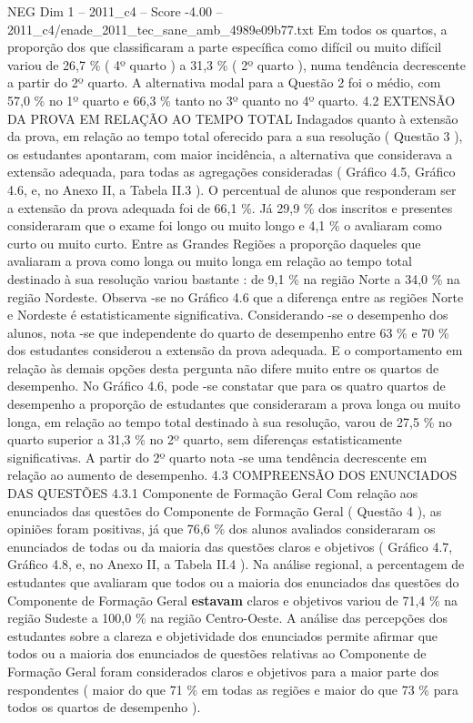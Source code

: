 \begin{textsample}{NEG Dim 1 – 2011\_c4 – Score -4.00 – 2011\_c4/enade\_2011\_tec\_sane\_amb\_4989e09b77.txt}
Em todos os quartos, a proporção dos que classificaram a parte específica como difícil ou muito difícil variou de 26,7 \% ( 4º quarto ) a 31,3 \% ( 2º quarto ), numa tendência decrescente a partir do 2º quarto.
A alternativa modal para a Questão 2 foi o médio, com 57,0 \% no 1º quarto e 66,3 \% tanto no 3º quanto no 4º quarto. 4.2 EXTENSÃO DA PROVA EM RELAÇÃO AO TEMPO TOTAL Indagados quanto à extensão da prova, em relação ao tempo total oferecido para a sua resolução ( Questão 3 ), os estudantes apontaram, com maior incidência, a alternativa que considerava a extensão adequada, para todas as agregações consideradas ( Gráfico 4.5, Gráfico 4.6, e, no Anexo II, a Tabela II.3 ).
O percentual de alunos que responderam ser a extensão da prova adequada foi de 66,1 \%.
Já 29,9 \% dos inscritos e presentes consideraram que o exame foi longo ou muito longo e 4,1 \% o avaliaram como curto ou muito curto.
Entre as Grandes Regiões a proporção daqueles que avaliaram a prova como longa ou muito longa em relação ao tempo total destinado à sua resolução variou bastante : de 9,1 \% na região Norte a 34,0 \% na região Nordeste.
Observa -se no Gráfico 4.6 que a diferença entre as regiões Norte e Nordeste é estatisticamente significativa.
Considerando -se o desempenho dos alunos, nota -se que independente do quarto de desempenho entre 63 \% e 70 \% dos estudantes considerou a extensão da prova adequada.
E o comportamento em relação às demais opções desta pergunta não difere muito entre os quartos de desempenho.
No Gráfico 4.6, pode -se constatar que para os quatro quartos de desempenho a proporção de estudantes que consideraram a prova longa ou muito longa, em relação ao tempo total destinado à sua resolução, varou de 27,5 \% no quarto superior a 31,3 \% no 2º quarto, sem diferenças estatisticamente significativas.
A partir do 2º quarto nota -se uma tendência decrescente em relação ao aumento de desempenho. 4.3 COMPREENSÃO DOS ENUNCIADOS DAS QUESTÕES 4.3.1 Componente de Formação Geral Com relação aos enunciados das questões do Componente de Formação Geral ( Questão 4 ), as opiniões foram positivas, já que 76,6 \% dos alunos avaliados consideraram os enunciados de todas ou da maioria das questões claros e objetivos ( Gráfico 4.7, Gráfico 4.8, e, no Anexo II, a Tabela II.4 ).
Na análise regional, a percentagem de estudantes que avaliaram que todos ou a maioria dos enunciados das questões do Componente de Formação Geral \textbf{estavam} claros e objetivos variou de 71,4 \% na região Sudeste a 100,0 \% na região Centro-Oeste.
A análise das percepções dos estudantes sobre a clareza e objetividade dos enunciados permite afirmar que todos ou a maioria dos enunciados de questões relativas ao Componente de Formação Geral foram considerados claros e objetivos para a maior parte dos respondentes ( maior do que 71 \% em todas as regiões e maior do que 73 \% para todos os quartos de desempenho ).

\end{textsample}
